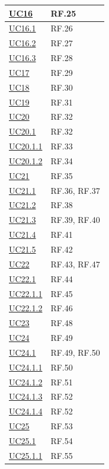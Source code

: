 \documentclass[12pt, a4paper]{article}
\begin{document}
\begin{longtable}{|l|p{}|}
\hyperref[uc:16]{UC16} & RF.25 \\ \hline
\hyperref[uc:16.1]{UC16.1} & RF.26 \\ \hline
\hyperref[uc:16.2]{UC16.2} & RF.27 \\ \hline
\hyperref[uc:16.3]{UC16.3} & RF.28 \\ \hline
\hyperref[uc:17]{UC17} & RF.29 \\ \hline
\hyperref[uc:18]{UC18} & RF.30 \\ \hline
\hyperref[uc:19]{UC19} & RF.31 \\ \hline
\hyperref[uc:20]{UC20} & RF.32 \\ \hline
\hyperref[uc:20.1]{UC20.1} & RF.32 \\ \hline
\hyperref[uc:20.1.1]{UC20.1.1} & RF.33 \\ \hline
\hyperref[uc:20.1.2]{UC20.1.2} & RF.34 \\ \hline
\hyperref[uc:21]{UC21} & RF.35 \\ \hline
\hyperref[uc:21.1]{UC21.1} & RF.36, RF.37 \\ \hline
\hyperref[uc:21.2]{UC21.2} & RF.38 \\ \hline
\hyperref[uc:21.3]{UC21.3} & RF.39, RF.40 \\ \hline
\hyperref[uc:21.4]{UC21.4} & RF.41 \\ \hline
\hyperref[uc:21.5]{UC21.5} & RF.42 \\ \hline
\hyperref[uc:22]{UC22} & RF.43, RF.47 \\ \hline
\hyperref[uc:22.1]{UC22.1} & RF.44 \\ \hline
\hyperref[uc:22.1.1]{UC22.1.1} & RF.45 \\ \hline
\hyperref[uc:22.1.2]{UC22.1.2} & RF.46 \\ \hline
\hyperref[uc:23]{UC23} & RF.48 \\ \hline
\hyperref[uc:24]{UC24} & RF.49 \\ \hline
\hyperref[uc:24.1]{UC24.1} & RF.49, RF.50 \\ \hline
\hyperref[uc:24.1.1]{UC24.1.1} & RF.50 \\ \hline
\hyperref[uc:24.1.2]{UC24.1.2} & RF.51 \\ \hline
\hyperref[uc:24.1.3]{UC24.1.3} & RF.52 \\ \hline
\hyperref[uc:24.1.4]{UC24.1.4} & RF.52 \\ \hline
\hyperref[uc:25]{UC25} & RF.53 \\ \hline
\hyperref[uc:25.1]{UC25.1} & RF.54 \\ \hline
\hyperref[uc:25.1.1]{UC25.1.1} & RF.55 \\ \hline

\end{longtable}
\end{document}
